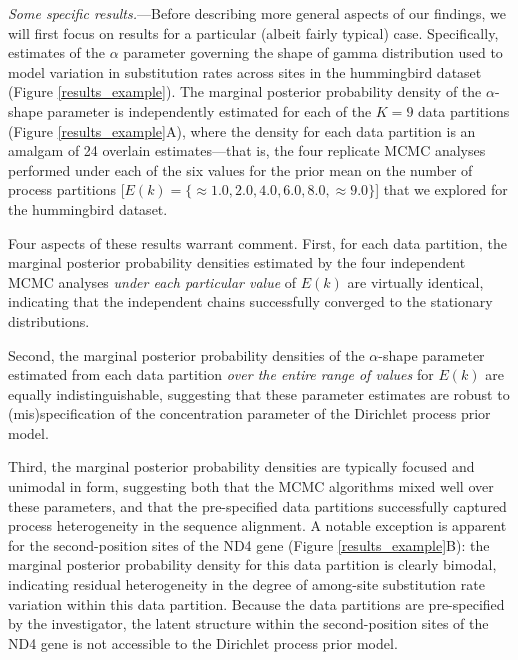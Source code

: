 \documentclass[11pt]{article}
\begin{document}
\bigskip
\noindent
{\it Some specific results.}---Before describing more general aspects of our findings, we will first focus on results for a particular (albeit fairly typical) case.  Specifically, estimates of the $\alpha$ parameter governing the shape of gamma distribution used to model variation in substitution rates across sites in the 
hummingbird dataset (Figure \ref{results_example}).
The marginal posterior probability density of the $\alpha$-shape parameter is independently estimated for each of the $K = 9$ data partitions (Figure \ref{results_example}A), where the density for each data partition is an amalgam of 24 overlain estimates---that is, the four replicate MCMC analyses performed under each of the six values for the prior mean on the number of process partitions [$E(k) = \{\approx 1.0, 2.0, 4.0, 6.0, 8.0, \approx 9.0\}$] that we explored for the hummingbird dataset.

Four aspects of these results warrant comment.  
First, for each data partition, the marginal posterior probability densities estimated by the four independent MCMC analyses {\it under each particular value} of $E(k)$ are virtually identical, indicating that the independent chains successfully converged to the stationary distributions.

Second, the marginal posterior probability densities of the $\alpha$-shape parameter estimated from each data partition {\it over the entire range of values} for $E(k)$ are equally indistinguishable, suggesting that these parameter estimates are robust to (mis)specification of the concentration parameter of the Dirichlet process prior model.

Third, the marginal posterior probability densities are typically focused and unimodal in form, suggesting both that the MCMC algorithms mixed well over these parameters, and that the pre-specified data partitions successfully captured process heterogeneity in the sequence alignment.  
A notable exception is apparent for the second-position sites of the ND4 gene (Figure \ref{results_example}B): the marginal posterior probability density for this data partition is clearly bimodal, indicating residual heterogeneity in the degree of among-site substitution rate variation within this data partition.  
Because the data partitions are pre-specified by the investigator, the latent structure within the second-position sites of the ND4 gene is not accessible to the Dirichlet process prior model.
\end{document}
